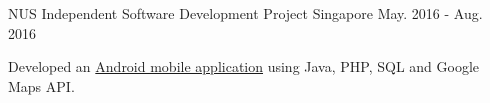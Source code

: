 \begin{cventries}
  \cventry
    {NUS} %
    {Independent Software Development Project} %
    {Singapore} %
    {May. 2016 - Aug. 2016} %
    {
      \begin{cvitems} %
        \item {Developed an \href{https://github.com/Zhiyuan-Amos/Wut-2-Do}{Android mobile application} using Java, PHP, SQL and Google Maps API.}
      \end{cvitems}
    }

\end{cventries}
